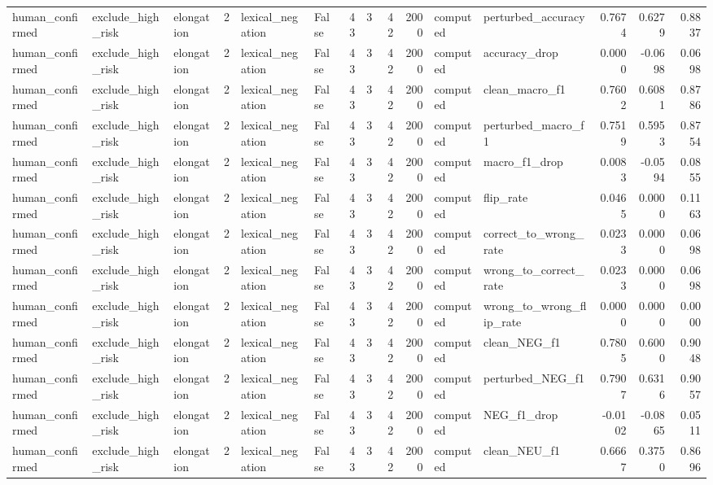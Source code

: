 \begin{tabular}{lllrllrrrrllrrr}
human_confirmed & exclude_high_risk & elongation & 2 & lexical_negation & False & 43 & 3 & 42 & 2000 & computed & perturbed_accuracy & 0.7674 & 0.6279 & 0.8837 \\
human_confirmed & exclude_high_risk & elongation & 2 & lexical_negation & False & 43 & 3 & 42 & 2000 & computed & accuracy_drop & 0.0000 & -0.0698 & 0.0698 \\
human_confirmed & exclude_high_risk & elongation & 2 & lexical_negation & False & 43 & 3 & 42 & 2000 & computed & clean_macro_f1 & 0.7602 & 0.6081 & 0.8786 \\
human_confirmed & exclude_high_risk & elongation & 2 & lexical_negation & False & 43 & 3 & 42 & 2000 & computed & perturbed_macro_f1 & 0.7519 & 0.5953 & 0.8754 \\
human_confirmed & exclude_high_risk & elongation & 2 & lexical_negation & False & 43 & 3 & 42 & 2000 & computed & macro_f1_drop & 0.0083 & -0.0594 & 0.0855 \\
human_confirmed & exclude_high_risk & elongation & 2 & lexical_negation & False & 43 & 3 & 42 & 2000 & computed & flip_rate & 0.0465 & 0.0000 & 0.1163 \\
human_confirmed & exclude_high_risk & elongation & 2 & lexical_negation & False & 43 & 3 & 42 & 2000 & computed & correct_to_wrong_rate & 0.0233 & 0.0000 & 0.0698 \\
human_confirmed & exclude_high_risk & elongation & 2 & lexical_negation & False & 43 & 3 & 42 & 2000 & computed & wrong_to_correct_rate & 0.0233 & 0.0000 & 0.0698 \\
human_confirmed & exclude_high_risk & elongation & 2 & lexical_negation & False & 43 & 3 & 42 & 2000 & computed & wrong_to_wrong_flip_rate & 0.0000 & 0.0000 & 0.0000 \\
human_confirmed & exclude_high_risk & elongation & 2 & lexical_negation & False & 43 & 3 & 42 & 2000 & computed & clean_NEG_f1 & 0.7805 & 0.6000 & 0.9048 \\
human_confirmed & exclude_high_risk & elongation & 2 & lexical_negation & False & 43 & 3 & 42 & 2000 & computed & perturbed_NEG_f1 & 0.7907 & 0.6316 & 0.9057 \\
human_confirmed & exclude_high_risk & elongation & 2 & lexical_negation & False & 43 & 3 & 42 & 2000 & computed & NEG_f1_drop & -0.0102 & -0.0865 & 0.0511 \\
human_confirmed & exclude_high_risk & elongation & 2 & lexical_negation & False & 43 & 3 & 42 & 2000 & computed & clean_NEU_f1 & 0.6667 & 0.3750 & 0.8696 \\

\end{tabular}
